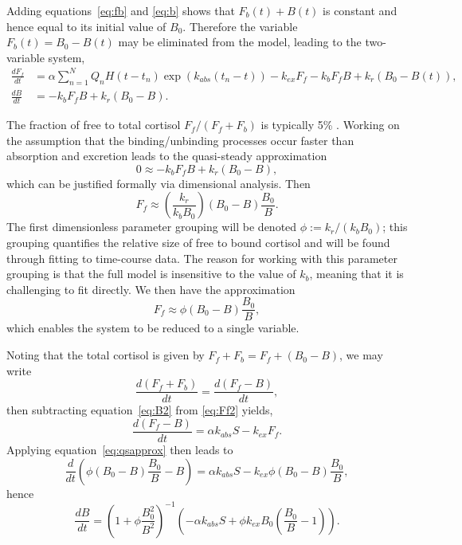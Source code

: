 \documentclass[12pt,a4paper]{article}
\newcommand{\dd}[2]{\frac{d #1}{d #2}}
\begin{document}
Adding equations~\eqref{eq:fb} and \eqref{eq:b} shows that \(F_b(t)+B(t)\) is constant and hence equal to its initial value of \(B_0\). Therefore the variable \(F_b(t)=B_0-B(t)\) may be eliminated from the model, leading to the two-variable system,
\begin{align}
    \dd{F_f}{t} & = \alpha\sum_{n=1}^N Q_n H(t-t_n) \exp(k_{abs}(t_n-t)) - k_{ex}F_f - k_b F_f B + k_r (B_0-B(t)), \label{eq:Ff2}\\
    \dd{B}{t} & = -k_b F_f B + k_r (B_0-B)\label{eq:B2}.
\end{align}

The fraction of free to total cortisol \(F_f/(F_f+F_b)\) is typically 5\% \cite{mattos2013}. Working on the assumption that the binding/unbinding processes occur faster than absorption and excretion leads to the quasi-steady approximation
\begin{equation}
    0\approx -k_b F_f B + k_r (B_0-B),
\end{equation}
which can be justified formally via dimensional analysis. Then
\begin{equation}
    F_f \approx \left(\frac{k_r}{k_b B_0}\right) (B_0-B) \frac{B_0}{B}.
\end{equation}
The first dimensionless parameter grouping will be denoted \(\phi:=k_r/(k_b B_0)\); this grouping quantifies the relative size of free to bound cortisol and will be found through fitting to time-course data. The reason for working with this parameter grouping is that the full model is insensitive to the value of \(k_b\), meaning that it is challenging to fit directly. We then have the approximation
\begin{equation}
    F_f\approx \phi (B_0-B) \frac{B_0}{B},\label{eq:qsapprox}
\end{equation}
which enables the system to be reduced to a single variable.

Noting that the total cortisol is given by \(F_f+F_b=F_f+(B_0-B)\), we may write
\begin{equation}
    \dd{(F_f+F_b)}{t}=\dd{(F_f-B)}{t},
\end{equation}
then subtracting equation~\eqref{eq:B2} from \eqref{eq:Ff2} yields,
\begin{equation}
    \dd{(F_f-B)}{t}=\alpha k_{abs}S-k_{ex}F_f.
\end{equation}
Applying equation~\eqref{eq:qsapprox} then leads to
\begin{equation}
    \dd{}{t}\left(\phi(B_0-B)\frac{B_0}{B}-B\right) = \alpha k_{abs} S - k_{ex}\phi(B_0-B)\frac{B_0}{B},
\end{equation}
hence
\begin{equation}
    \dd{B}{t} = \left(1+\phi\frac{B_0^2}{B^2}\right)^{-1}\left( - \alpha k_{abs} S + \phi k_{ex} B_0\left(\frac{B_0}{B}-1\right)\right).
\end{equation}
\end{document}
